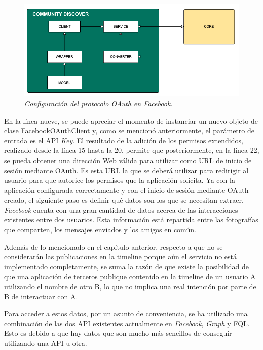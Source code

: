 \begin{figure}
	\centering
	\includegraphics[scale=1]{images/Figura4-2}
	\caption{\em Configuración del protocolo OAuth en \textit{Facebook}.}
	\label{fig:ext-im2}
\end{figure}

En la línea nueve, se puede apreciar el momento de instanciar un nuevo objeto de clase FacebookOAuthClient y, como se mencionó anteriormente, el parámetro de entrada es el API \textit{Key}. El resultado de la adición de los permisos extendidos, realizado desde la línea 15 hasta la 20, permite que posteriormente, en la línea 22, se pueda obtener una dirección Web válida para utilizar como URL de inicio de sesión mediante OAuth. Es esta URL la que se deberá utilizar para redirigir al usuario para que autorice los permisos que la aplicación solicita. Ya con la aplicación configurada correctamente y con el inicio de sesión mediante OAuth creado, el siguiente paso es definir qué datos son los que se necesitan extraer.
\textit{Facebook} cuenta con una gran cantidad de datos acerca de las interacciones existentes entre dos usuarios. Esta información está repartida entre las fotografías que comparten, los mensajes enviados y los amigos en común. 

Además de lo mencionado en el capítulo anterior, respecto a que no se considerarán las publicaciones en la timeline porque aún el servicio no está implementado completamente, se suma la razón de que existe la posibilidad de que una aplicación de terceros publique contenido en la timeline de un usuario A utilizando el nombre de otro B, lo que no implica una real intención por parte de B de interactuar con A.

Para acceder a estos datos, por un asunto de conveniencia, se ha utilizado una combinación de las dos API existentes actualmente en \textit{Facebook}, \textit{Graph} y FQL. Esto es debido a que hay datos que son mucho más sencillos de conseguir utilizando una API u otra. 

